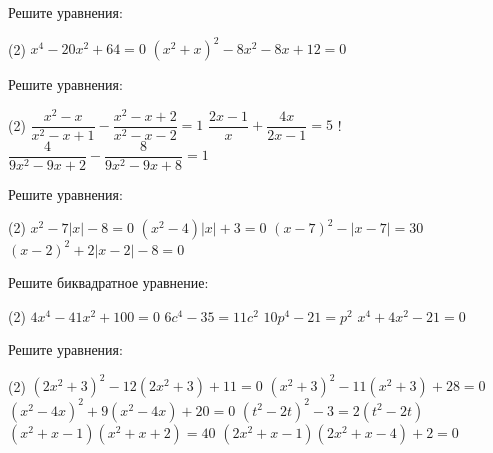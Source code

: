 %
%

\begin{class}[number=1]
	\begin{listofex}
		\item Решите уравнения:
		\begin{tasks}(2)
			\task \( x^4-20x^2+64=0 \)
			\task \( (x^2+x)^2-8x^2-8x+12=0 \)
		\end{tasks}
		\item Решите уравнения:
		\begin{tasks}(2)
			\task \( \dfrac{x^2-x}{x^2-x+1}-\dfrac{x^2-x+2}{x^2-x-2}=1 \)
			\task \( \dfrac{2x-1}{x}+\dfrac{4x}{2x-1}=5 \)
			\task! \( \dfrac{4}{9x^2-9x+2}-\dfrac{8}{9x^2-9x+8}=1 \)
		\end{tasks}
		\item Решите уравнения:
		\begin{tasks}(2)
			\task \( x^2-7|x|-8=0 \)
			\task \( (x^2-4)|x|+3=0 \)
			\task \( (x-7)^2-|x-7|=30 \)
			\task \( (x-2)^2+2|x-2|-8=0 \)
		\end{tasks}
	\end{listofex}
\end{class}

\begin{class}[number=2]
	\begin{listofex}
		\item Решите биквадратное уравнение:
		\begin{tasks}(2)
			\task \( 4x^4-41x^2+100=0 \)
			\task \( 6c^4-35=11c^2 \)
			\task \( 10p^4-21=p^2 \)
			\task \( x^4+4x^2-21=0 \)
		\end{tasks}
		\item Решите уравнения:
		\begin{tasks}(2)
			\task \( (2x^2+3)^2-12(2x^2+3)+11=0 \)
			\task \( (x^2+3)^2-11(x^2+3)+28=0 \)
			\task \( (x^2-4x)^2+9(x^2-4x)+20=0 \)
			\task \( (t^2-2t)^2-3=2(t^2-2t) \)
			\task \( (x^2+x-1)(x^2+x+2)=40 \)
			\task \( (2x^2+x-1)(2x^2+x-4)+2=0 \)
		\end{tasks}
	\end{listofex}
\end{class}

